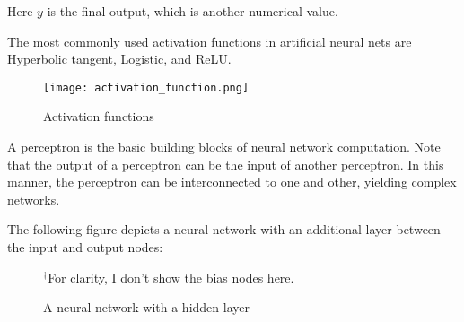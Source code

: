 Here $y$ is the final output, which is another numerical value. 

The most commonly used activation functions in artificial neural nets are Hyperbolic tangent, Logistic, and ReLU.

\begin{figure}
\caption{Activation functions}
\centering
\texttt{[image: activation\_function.png]}
\end{figure} 

A perceptron is the basic building blocks of neural network computation. Note that the output of a perceptron can be the input of another perceptron. 
In this manner, the perceptron can be interconnected to one and other, yielding complex networks. 

The following figure depicts a neural network with an additional layer between the input and output nodes:

\begin{figure}[h!]
\caption{A neural network with a hidden layer}
\centering
{}

\rule{0in}{1.2em}$^\dag$\scriptsize For clarity, I don't show the bias nodes here.\\

\end{figure}    

